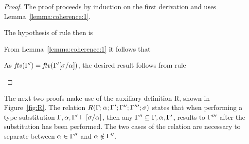 {\centering
{}}

\begin{proof}
  The proof proceeds by induction on the first derivation and uses Lemma~\ref{lemma:coherence:1}.
  
  The hypothesis of rule  then is
\begin{myequation*}
\end{myequation*}

  From Lemma~\ref{lemma:coherence:1} it follows that
\begin{myequation*}
\end{myequation*}

  As ${\it ftv }(\Gamma') = {\it ftv }(\Gamma'[\sigma/\alpha])$, the desired result follows from rule
\begin{myequation*}
\end{myequation*}
\end{proof}

The next two proofs make use of the auxiliary definition R, shown in
Figure~\ref{fig:R}. The relation $R(\Gamma;\alpha;\Gamma';\Gamma'';\Gamma''';\sigma)$ states that
when performing a type substitution $\Gamma,\alpha,\Gamma' \vdash [\sigma/\alpha]$, then
any $\Gamma'' \subseteq \Gamma,\alpha,\Gamma'$, results to $\Gamma'''$ after the substitution has
been performed. The two cases of the relation are necessary to separate between
$\alpha\in\Gamma''$ and $\alpha\notin\Gamma''$.

